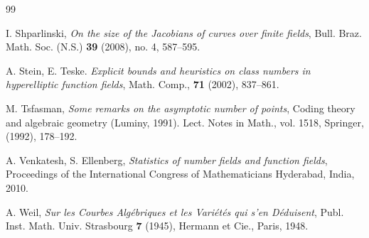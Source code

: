\documentclass[12pt]{amsart}
\theoremstyle{plain}
\begin{document}
\begin{thebibliography}{99}





 I. Shparlinski, \emph{On the size of the Jacobians of curves over finite fields}, Bull. Braz. Math. Soc. (N.S.) {\bf 39} (2008), no. 4, 587--595.


 A. Stein, E. Teske. \emph{Explicit bounds and heuristics on class numbers in hyperelliptic function fields}, Math. Comp., {\bf 71} (2002), 837--861.

 M. Tsfasman, \emph{Some remarks on the asymptotic number of points}, Coding theory and algebraic geometry (Luminy, 1991). Lect. Notes in Math., vol. 1518, Springer, (1992), 178--192.

 A. Venkatesh, S. Ellenberg, \emph{Statistics of number fields and function fields}, Proceedings of the International Congress of Mathematicians Hyderabad, India, 2010.

 A. Weil, \emph{Sur les Courbes Alg\'ebriques et les Vari\'et\'es qui s'en D\'eduisent}, Publ. Inst. Math. Univ. Strasbourg {\bf 7} (1945),  Hermann et Cie., Paris, 1948.


\end{thebibliography}
\end{document}

